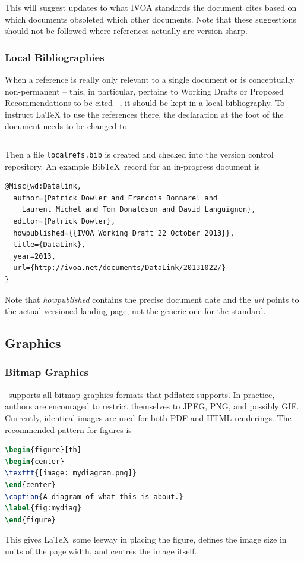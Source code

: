 \documentclass[11pt,a4paper]{ivoa}
\newcommand{\BibTeX}{BibTeX}
\begin{document}
This will suggest updates to what IVOA standards the document cites
based on which documents obsoleted which other documents.  Note that
these suggestions should not be followed where references actually are
version-sharp.

\subsubsection{Local Bibliographies}

When a reference is really only relevant to a single document or is
conceptually non-permanent -- this, in particular, pertains to Working
Drafts or Proposed Recommendations to be cited --, it should be kept in a
local bibliography.  To instruct \LaTeX{} to use the references there,
the declaration at the foot of the document needs to be
changed to

\begin{lstlisting}

\end{lstlisting}

Then a file \texttt{localrefs.bib} is created and checked into the
version control repository.  An example \BibTeX\ record for an
in-progress document is

\begin{lstlisting}
@Misc{wd:Datalink,
  author={Patrick Dowler and Francois Bonnarel and 
    Laurent Michel and Tom Donaldson and David Languignon},
  editor={Patrick Dowler},
  howpublished={{IVOA Working Draft 22 October 2013}},
  title={DataLink},
  year=2013,
  url={http://ivoa.net/documents/DataLink/20131022/}
}
\end{lstlisting}

Note that \emph{howpublished} contains the precise document date and the
\emph{url} points to the actual versioned landing page, not the generic
one for the standard.

\subsection{Graphics}

\subsubsection{Bitmap Graphics}

\ivoatex\ supports all bitmap graphics formats that pdflatex supports.
In practice, authors are encouraged to restrict themselves to JPEG, PNG,
and possibly GIF.  Currently, identical images are used for both PDF and
HTML renderings.  The recommended pattern for figures is
\begin{lstlisting}[language=tex]
\begin{figure}[th]
\begin{center}
\texttt{[image: mydiagram.png]}
\end{center}
\caption{A diagram of what this is about.}
\label{fig:mydiag}
\end{figure}
\end{lstlisting}
This gives \LaTeX\ some leeway in placing the figure, defines the image
size in units of the page width, and centres the image itself.
\end{document}
